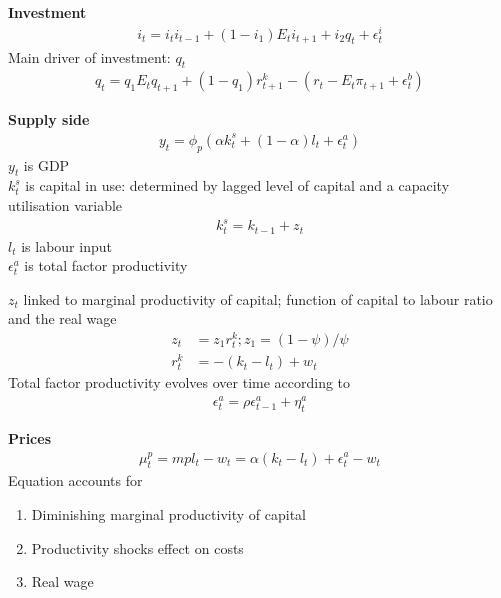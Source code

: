 \documentclass{beamer}
\begin{document}
\begin{frame}
  \textbf{Investment}  
\begin{align}
  i_t = i_ti_{t-1} + (1-i_1)E_ti_{t+1} + i_2q_t + \epsilon_t^i
\end{align}
 Main driver of investment: $q_t$
\begin{align}
  q_t = q_1E_tq_{t+1} + (1-q_1)r_{t+1}^k - (r_t - E_t\pi_{t+1} + \epsilon_t^b)
\end{align}
\end{frame}


\begin{frame}
 \textbf{Supply side}  
\begin{align}
  y_t=\phi_p(\alpha k_t^s + (1-\alpha)l_t + \epsilon_t^a)
\end{align}
$y_t$ is GDP\\
$k^s_t$ is capital in use: determined by lagged level of capital and a capacity utilisation variable
\begin{align}
  k_t^s = k_{t-1} + z_t
\end{align}
$l_t$ is labour input\\
$\epsilon_t^a$ is total factor productivity
\end{frame}

\begin{frame}
 $z_t$ linked to marginal productivity of capital; function of capital to labour ratio and the real wage
\begin{align}
  z_t&=z_1r_t^k; z_1=(1-\psi)/ \psi\\
  r_t^k &= -(k_t-l_t) + w_t
\end{align}
\medskip
Total factor productivity evolves over time according to
\begin{align}
  \epsilon_t^a = \rho \epsilon_{t-1}^a + \eta_t^a
\end{align}
\end{frame}

\begin{frame}
 \textbf{Prices}  
\begin{align}
  \mu_t^p = mpl_t-w_t=\alpha(k_t-l_t) + \epsilon_t^a - w_t
\end{align}
 Equation accounts for 
 \begin{enumerate}
   \item Diminishing marginal productivity of capital 
   \item Productivity shocks effect on costs
   \item Real wage
 \end{enumerate}
\end{frame}
\end{document}
